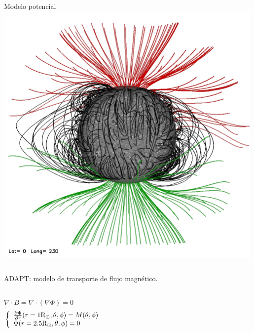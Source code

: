 \documentclass{beamer}
\begin{document}
{\begin{columns}
\centering Modelo potencial
\includegraphics[width=0.99\textwidth]{figuras/CR2081.jpg}
\end{columns}
\bu \small{ADAPT: modelo de transporte de flujo magnético.}


\vskip -0.2cm
\begin{columns}
$\nabla \cdot B = \nabla \cdot (\nabla \Phi)  = 0$
\begin{equation*}
\left\lbrace
  \begin{array}{l}
 \frac{\partial \Phi}{\partial r} (r=1{\rm R_\odot},\theta,\phi)  = M(\theta,\phi) \nonumber \\
 \Phi(r=2.5{\rm R_\odot},\theta,\phi)  = 0 \nonumber
\end{array}
\right.
\end{equation*}
\end{columns}
}
\end{document}
